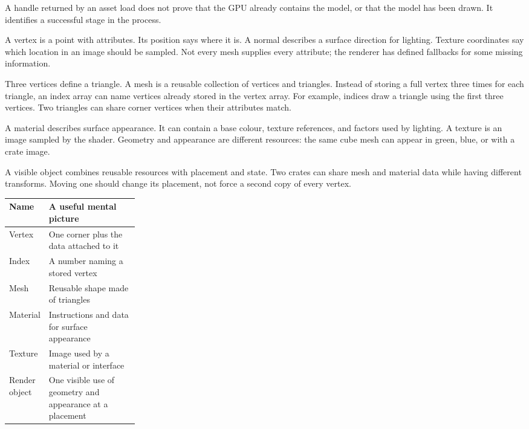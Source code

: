 \documentclass[11pt,a4paper]{article}
\begin{document}
\begin{remember}A handle returned by an asset load does not prove that the GPU already contains the model, or that the model has been drawn. It identifies a successful stage in the process.\end{remember}

A vertex is a point with attributes. Its position says where it is. A normal describes a surface direction for lighting. Texture coordinates say which location in an image should be sampled. Not every mesh supplies every attribute; the renderer has defined fallbacks for some missing information.

Three vertices define a triangle. A mesh is a reusable collection of vertices and triangles. Instead of storing a full vertex three times for each triangle, an index array can name vertices already stored in the vertex array. For example, indices  draw a triangle using the first three vertices. Two triangles can share corner vertices when their attributes match.

A material describes surface appearance. It can contain a base colour, texture references, and factors used by lighting. A texture is an image sampled by the shader. Geometry and appearance are different resources: the same cube mesh can appear in green, blue, or with a crate image.

A visible object combines reusable resources with placement and state. Two crates can share mesh and material data while having different transforms. Moving one should change its placement, not force a second copy of every vertex.

\begin{tabularx}{\linewidth}{@{}p{0.25\linewidth}X@{}}
\toprule Name & A useful mental picture \\\midrule
Vertex & One corner plus the data attached to it \\
Index & A number naming a stored vertex \\
Mesh & Reusable shape made of triangles \\
Material & Instructions and data for surface appearance \\
Texture & Image used by a material or interface \\
Render object & One visible use of geometry and appearance at a placement \\
\bottomrule
\end{tabularx}
\end{document}
